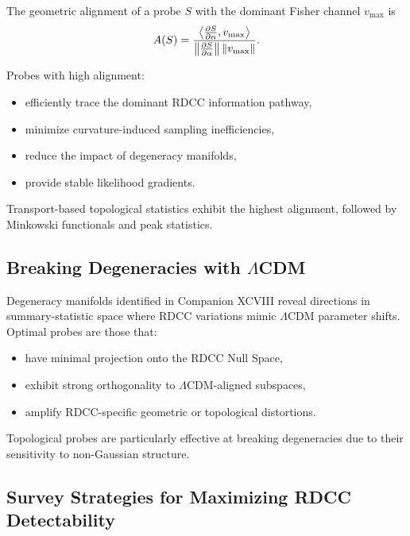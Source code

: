 \documentclass[11pt,a4paper]{article}
\begin{document}
The geometric alignment of a probe $S$ with the dominant Fisher channel
$v_{\max}$ is
\begin{equation}
    A(S)
    =
    \frac{
        \left\langle
            \pdv{S}{\alpha},
            v_{\max}
        \right\rangle
    }{
        \norm{\pdv{S}{\alpha}}\,\norm{v_{\max}}
    }.
\end{equation}

Probes with high alignment:

\begin{itemize}
    \item efficiently trace the dominant RDCC information pathway,
    \item minimize curvature-induced sampling inefficiencies,
    \item reduce the impact of degeneracy manifolds,
    \item provide stable likelihood gradients.
\end{itemize}

Transport-based topological statistics exhibit the highest alignment, followed
by Minkowski functionals and peak statistics.

\subsection{Breaking Degeneracies with \texorpdfstring{$\Lambda$CDM}{ΛCDM}}

Degeneracy manifolds identified in Companion XCVIII reveal directions in
summary-statistic space where RDCC variations mimic $\Lambda$CDM parameter
shifts. Optimal probes are those that:

\begin{itemize}
    \item have minimal projection onto the RDCC Null Space,
    \item exhibit strong orthogonality to $\Lambda$CDM-aligned subspaces,
    \item amplify RDCC-specific geometric or topological distortions.
\end{itemize}

Topological probes are particularly effective at breaking degeneracies due to
their sensitivity to non-Gaussian structure.

\subsection{Survey Strategies for Maximizing RDCC Detectability}
\end{document}
